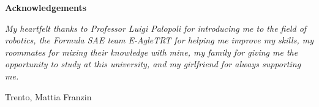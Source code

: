 \thispagestyle{empty}

\begin{center}
  {\bf \Huge Acknowledgements}
\end{center}

\vspace{4cm}

\noindent\emph{
My heartfelt thanks to Professor Luigi Palopoli for introducing me to the field of robotics, the Formula SAE team E-AgleTRT for helping me improve my skills, my roommates for mixing their knowledge with mine, my family for giving me the opportunity to study at this university, and my girlfriend for always supporting me.
}

\bigskip

\noindent Trento, \makeatletter\@date\makeatother
\hfill
Mattia Franzin
